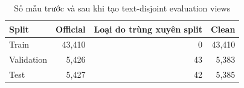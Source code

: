 \begin{table}[H]
\centering
\small
\begin{tabular}{lrrr}
\toprule
\textbf{Split} & \textbf{Official} & \textbf{Loại do trùng xuyên split} & \textbf{Clean} \\
\midrule
Train & 43,410 & 0 & 43,410 \\
Validation & 5,426 & 43 & 5,383 \\
Test & 5,427 & 42 & 5,385 \\
\bottomrule
\end{tabular}
\caption{Số mẫu trước và sau khi tạo text-disjoint evaluation views}
\label{tab:clean-splits}
\end{table}
